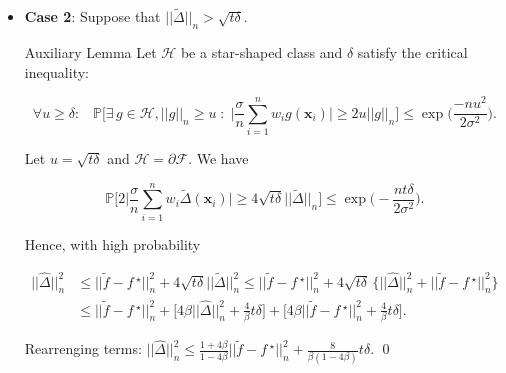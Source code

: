 \documentclass[11pt]{beamer}
\newcommand{\Prob}{\mathbb{P}}
\newcommand{\bx}{\mathbf{x}}
\newcommand{\cF}{\mathcal{F}}
\newcommand{\fstar}{f\,^\star}
\newcommand{\ftilde}{\widetilde{f}}
\newcommand{\Dhat}{\widehat{\Delta}}
\newcommand{\Dtilde}{\widetilde{\Delta}}
\begin{document}
	\begin{frame}
		\begin{itemize}
			\item \textbf{Case 2}: Suppose that $||\Dtilde||_n > \sqrt{t\delta}$.
			\begin{block}{Auxiliary Lemma}
				Let $\mathcal{H}$ be a star-shaped class and $\delta$ satisfy the critical inequality:
				\begin{small}
					
					\vspace{-0.3cm}
					\begin{equation*}
					\forall u\geq \delta:\;\;\;\Prob\Bigg[\exists\, g \in \mathcal{H}, ||g||_n \geq u \;:\; \Big|\frac{\sigma}{n}\sum_{i = 1}^{n} w_i g(\bx_i)\Big|\geq 2u ||g||_n\Bigg] \leq \exp\big(\frac{-nu^2}{2\sigma^2}\big).
					\end{equation*}
				\end{small}
				\vspace{-0.3cm}
				
			\end{block}
			Let $u = \sqrt{t\delta}$ and $\mathcal{H} = \partial \cF$. We have
			\begin{small}
			\begin{equation*}
				\Prob\Big[2\big|\frac{\sigma}{n} \sum_{i = 1}^{n}w_i \Dtilde(\bx_i)\big|\geq 4\sqrt{t\delta}||\Dtilde||_n\Big]\leq \exp\big(-\frac{nt\delta}{2\sigma^2}\big).
			\end{equation*}
			\end{small}
			\vspace{-0.3cm}
			
			Hence, with high probability
			\begin{small}
			\begin{align*}
				||\Dhat||_n^2 &\leq ||\ftilde - \fstar||_n^2 + 4\sqrt{t\delta} ||\Dtilde||_n^2
				\leq ||\ftilde - \fstar||_n^2 + 4\sqrt{t\delta} \,\Big\{||\Dhat||_n^2 + ||\ftilde - \fstar||_n^2\Big\}\\
				&\leq ||\ftilde - \fstar||_n^2 + \Big[4\beta ||\Dhat||_n^2 + \frac{4}{\beta}t \delta\Big] + \Big[4\beta||\ftilde - \fstar||_n^2 + \frac{4}{\beta} t\delta\Big].
			\end{align*}
			\end{small}
			Rearrenging terms: $
				||\Dhat||_n^2 \leq \frac{1+4\beta}{1 - 4\beta} ||\ftilde - \fstar||_n^2 + \frac{8}{\beta(1-4\beta)}t\delta.$ \qed
		\end{itemize}				
	\end{frame}
	
\end{document}
